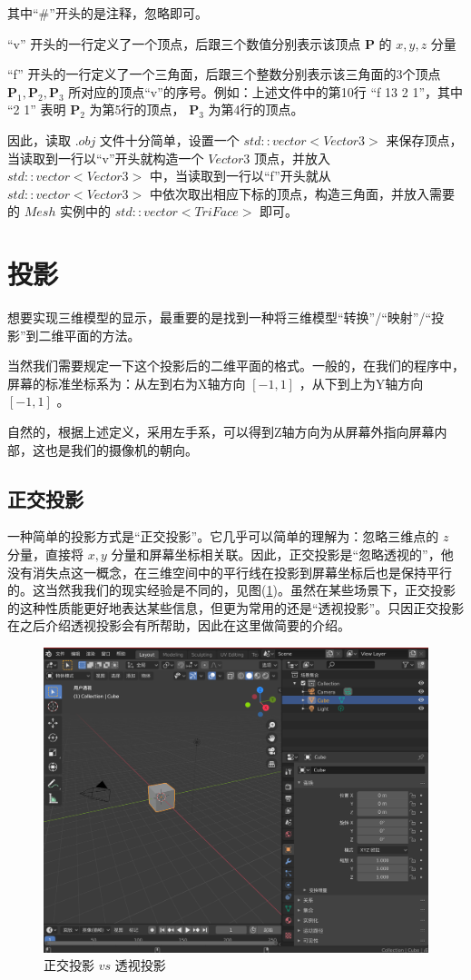 \documentclass[12pt,oneside,a4paper]{ctexart}
\begin{document}
其中“\#”开头的是注释，忽略即可。

“v” 开头的一行定义了一个顶点，后跟三个数值分别表示该顶点 $\mathbf{P}$ 的 $x, y, z$ 分量

“f” 开头的一行定义了一个三角面，后跟三个整数分别表示该三角面的3个顶点 $\mathbf{P}_1, \mathbf{P}_2, \mathbf{P}_3$ 所对应的顶点“v”的序号。例如：上述文件中的第10行 “f 13 2 1”，其中 “2 1” 表明 $\mathbf{P}_2$ 为第5行的顶点， $\mathbf{P}_3$ 为第4行的顶点。

因此，读取 $.obj$ 文件十分简单，设置一个 $std::vector<Vector3>$ 来保存顶点，当读取到一行以“v”开头就构造一个 $Vector3$ 顶点，并放入 $std::vector<Vector3>$ 中，当读取到一行以“f”开头就从 $std::vector<Vector3>$ 中依次取出相应下标的顶点，构造三角面，并放入需要的 $Mesh$ 实例中的 $std::vector<TriFace>$ 即可。
\section{投影}
想要实现三维模型的显示，最重要的是找到一种将三维模型“转换”/“映射”/“投影”到二维平面的方法。

当然我们需要规定一下这个投影后的二维平面的格式。一般的，在我们的程序中，屏幕的标准坐标系为：从左到右为X轴方向 $[-1,1]$ ，从下到上为Y轴方向 $[-1,1]$ 。

自然的，根据上述定义，采用左手系，可以得到Z轴方向为从屏幕外指向屏幕内部，这也是我们的摄像机的朝向。
\subsection{正交投影}

一种简单的投影方式是“正交投影”。它几乎可以简单的理解为：忽略三维点的 $z$ 分量，直接将 $x, y$ 分量和屏幕坐标相关联。因此，正交投影是“忽略透视的”，他没有消失点这一概念，在三维空间中的平行线在投影到屏幕坐标后也是保持平行的。这当然我我们的现实经验是不同的，见图(\ref{OrthVSPers})。虽然在某些场景下，正交投影的这种性质能更好地表达某些信息，但更为常用的还是“透视投影”。只因正交投影在之后介绍透视投影会有所帮助，因此在这里做简要的介绍。
\begin{figure}[H]
	\centering
	\includegraphics[scale=0.4]{Picture/Annotation 2020-06-23 205119.png}
	\vspace{-2ex}
	\caption{正交投影 $vs$ 透视投影}
	\label{OrthVSPers}
\end{figure}
\end{document}
